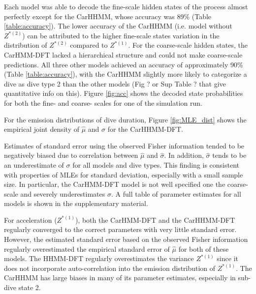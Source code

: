 \iffalse
Each model was able to decode the fine-scale hidden states of the process almost perfectly except for the CarHHMM, whose accuracy was 89\% (Table \ref{table:accuracy}). The lower accuracy of the CarHHMM (i.e. model without $Z^{*(2)}$)  can be attributed to the higher fine-scale states variation in the distribution of $Z^{*(2)}$ compared to $Z^{*(1)}$. For the coarse-scale hidden states, the CarHMM-DFT lacked a hierarchical structure and could not make coarse-scale predictions. All three other models achieved an accuracy of approximately 90\% (Table \ref{table:accuracy}), with the CarHHMM slightly more likely to categorize a dive as dive type 2 than the other models (Fig ? or Sup Table ? that give quantitative info on this). Figure \ref{fig:acc} shows the decoded state probabilities for both the fine- and coarse- scales for one of the simulation run.

For the emission distributions of dive duration, Figure \ref{fig:MLE_dist} shows the empirical joint density of $\hat \mu$ and $\hat \sigma$ for the CarHHMM-DFT.

Estimates of standard error using the observed Fisher information tended to be negatively biased due to correlation between $\hat \mu$ and $\hat \sigma$. In addition, $\hat \sigma$ tends to be an underestimate of $\sigma$ for all models and dive types. This finding is consistent with properties of MLEs for standard deviation, especially with a small sample size. In particular, the CarHMM-DFT model is not well specified one the coarse-scale and severely underestimates $\sigma$. %
A full table of parameter estimates for all models is shown in the supplementary material.


For acceleration ($Z^{*(1)}$), both the CarHMM-DFT and the CarHHMM-DFT regularly converged to the correct parameters with very little standard error. However, the estimated standard error based on the observed Fisher information regularly overestimated the empirical standard error of $\hat \mu$ for both of these models. 
The HHMM-DFT regularly overestimates the variance $Z^{*(1)}$ since it does not incorporate auto-correlation into the emission distribution of $Z^{*(1)}$. The CarHHMM has large biases in many of its parameter estimates, especially in sub-dive state 2. 

